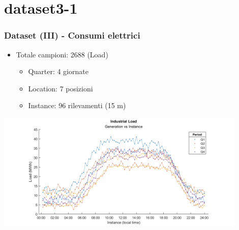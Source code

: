 \documentclass{beamer}
\begin{document}
\section{dataset3-1}
\begin{frame}
    \frametitle{Dataset (III) - Consumi elettrici}
    \vfill
    
    \begin{itemize}
        \item Totale campioni: 2688 (Load) \begin{itemize}   
            \item Quarter: 4 giornate
            \item Location: 7 posizioni
            \item Instance: 96 rilevamenti (15 m)
        \end{itemize}
    \end{itemize}
    \vfill
    \centering
    \includegraphics[width=0.9\textwidth,keepaspectratio]{all_industrial_load_period_lines.png}
        
\end{frame}

\end{document}

